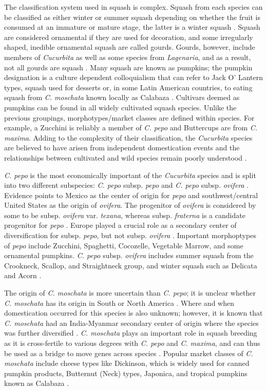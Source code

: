 \documentclass[utf8]{FrontiersinHarvard} %
\begin{document}
The classification system used in squash is complex.
Squash from each species can be classified as either winter or summer squash depending on whether the fruit is consumed at an immature or mature stage, the latter is a winter squash \citep{Loy2004}.
Squash are considered ornamental if they are used for decoration, and some irregularly shaped, inedible ornamental squash are called gourds. Gourds, however, include members of \emph{Cucurbita} as well as some species from \emph{Lagenaria}, and as a result, not all gourds are squash \citep{Paris2015}.
Many squash are known as pumpkins; the pumpkin designation is a culture dependent colloquialism that can refer to Jack O' Lantern types, squash used for desserts or, in some Latin American countries, to eating squash from \emph{C. moschata} known locally as Calabaza \citep{Ferriol}.
Cultivars deemed as pumpkins can be found in all widely cultivated squash species.
Unlike the previous groupings, morphotypes/market classes are defined within species.
For example, a Zucchini is reliably a member of \emph{C. pepo} and Buttercups are from \emph{C. maxima}.
Adding to the complexity of their classification, the \emph{Cucurbita} species are believed to have arisen from independent domestication events and the relationships between cultivated and wild species remain poorly understood \citep{Kates2017}.

\emph{C. pepo} is the most economically important of the \emph{Cucurbita} species and is split into two different subspecies: \emph{C. pepo} subsp. \emph{pepo} and \emph{C. pepo} subsp. \emph{ovifera} \citep{Xanthopoulou2019}.
Evidence points to Mexico as the center of origin for \emph{pepo} and southwest/central United States as the origin of \emph{ovifera}. The progenitor of \emph{ovifera} is considered by some to be subsp. \emph{ovifera} var. \emph{texana}, whereas subsp. \emph{fraterna} is a candidate progenitor for \emph{pepo} \citep{Kates2017}.
Europe played a crucial role as a secondary center of diversification for subsp. \emph{pepo}, but not subsp. \textit{ovifera} \citep{Lust2016}.
Important morphoptypes of \emph{pepo} include Zucchini, Spaghetti, Cocozelle, Vegetable Marrow, and some ornamental pumpkins.
\emph{C. pepo} subsp. \emph{ovifera} includes summer squash from the Crookneck, Scallop, and Straightneck group, and winter squash such as Delicata and Acorn \citep{Paris2012}.

The origin of \emph{C. moschata} is more uncertain than \emph{C. pepo}; it is unclear whether \emph{C. moschata} has its origin in South or North America \citep{Chomicki2020}.
Where and when domestication occurred for this species is also unknown; however, it is known that \emph{C. moschata} had an India-Myanmar secondary center of origin where the species was further diversified \citep{Sun2017}.
\emph{C. moschata} plays an important role in squash breeding as it is cross-fertile to various degrees with \emph{C. pepo} and \emph{C. maxima}, and can thus be used as a bridge to move genes across species \citep{Sun2017}.
Popular market classes of \emph{C. moschata} include cheese types like Dickinson, which is widely used for canned pumpkin products, Butternut (Neck) types, Japonica, and tropical pumpkins known as Calabaza \citep{Ferriol}.
\end{document}
